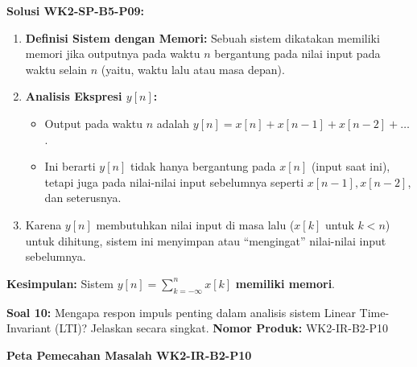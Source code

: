 \documentclass[
  letterpaper,
  DIV=11,
  numbers=noendperiod]{scrreprt}
\providecommand{\tightlist}{%
  \setlength{\itemsep}{0pt}\setlength{\parskip}{0pt}}
\begin{document}
\textbf{Solusi WK2-SP-B5-P09:}

\begin{enumerate}
\def\labelenumi{\arabic{enumi}.}
\tightlist
\item
  \textbf{Definisi Sistem dengan Memori:} Sebuah sistem dikatakan
  memiliki memori jika outputnya pada waktu \(n\) bergantung pada nilai
  input pada waktu selain \(n\) (yaitu, waktu lalu atau masa depan).
\item
  \textbf{Analisis Ekspresi \(y[n]\):}

  \begin{itemize}
  \tightlist
  \item
    Output pada waktu \(n\) adalah
    \(y[n] = x[n] + x[n-1] + x[n-2] + \dots\).
  \item
    Ini berarti \(y[n]\) tidak hanya bergantung pada \(x[n]\) (input
    saat ini), tetapi juga pada nilai-nilai input sebelumnya seperti
    \(x[n-1], x[n-2]\), dan seterusnya.
  \end{itemize}
\item
  Karena \(y[n]\) membutuhkan nilai input di masa lalu (\(x[k]\) untuk
  \(k < n\)) untuk dihitung, sistem ini menyimpan atau ``mengingat''
  nilai-nilai input sebelumnya.
\end{enumerate}

\textbf{Kesimpulan:} Sistem \(y[n] = \sum_{k=-\infty}^{n} x[k]\)
\textbf{memiliki memori}.

\textbf{Soal 10:} Mengapa respon impuls penting dalam analisis sistem
Linear Time-Invariant (LTI)? Jelaskan secara singkat. \textbf{Nomor
Produk:} WK2-IR-B2-P10

\textbf{Peta Pemecahan Masalah WK2-IR-B2-P10}
\end{document}
